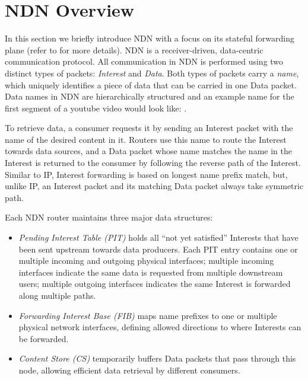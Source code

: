 \section{NDN Overview\label{sec:ccn-intro}}

In this section we briefly introduce NDN with a focus on its stateful forwarding plane (refer to \cite{ndn-conext, ndn-tr, adaptive-forwarding} for more details).
NDN is a receiver-driven, data-centric communication protocol.
All communication in NDN is performed using two distinct types of packets: \textit{Interest} and \textit{Data}. Both types of packets carry a \textit{name}, which uniquely identifies a piece of data that can be carried in one Data packet. 
Data names in NDN are hierarchically structured and an example name for the first segment of a youtube video would look like: .

To retrieve data, a consumer requests it by sending an Interest packet with the name of the desired content in it.
Routers use this name to route the Interest towards data sources, and a Data packet whose name matches the name in the Interest is returned to the consumer by following the reverse path of the Interest. Similar to IP, Interest forwarding is based on longest name prefix match, but, unlike IP, an Interest packet and its matching Data packet always take symmetric path.

Each NDN router maintains three major data structures:
\begin{itemize}
\item \textit{Pending Interest Table (PIT)} holds all ``not yet satisfied'' Interests that have been sent upstream towards data producers. Each PIT entry contains one or multiple incoming and outgoing physical interfaces; multiple incoming interfaces indicate the same data is requested from multiple downstream users; multiple outgoing interfaces indicates the same Interest is forwarded along multiple paths.
\item \textit{Forwarding Interest Base (FIB)} maps name prefixes to one or multiple physical network interfaces, defining allowed %
 directions to where Interests can be forwarded. 
\item \textit{Content Store (CS)} temporarily buffers Data packets that pass through this node, allowing efficient data retrieval by different consumers.
\end{itemize}


